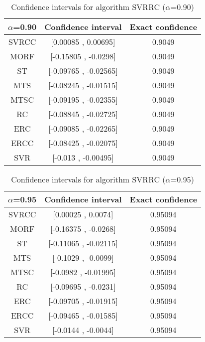 \documentclass[a4paper,10pt]{article}
\begin{document}
\begin{table}[!htp]
\centering\small
\begin{tabular}{
|c|c|c|}
\hline
 $\alpha$=0.90 & Confidence interval & Exact confidence \\ \hline 
SVRCC & [0.00085 , 0.00695] & 0.9049\\ \hline 
MORF & [-0.15805 , -0.0298] & 0.9049\\ \hline 
ST & [-0.09765 , -0.02565] & 0.9049\\ \hline 
MTS & [-0.08245 , -0.01515] & 0.9049\\ \hline 
MTSC & [-0.09195 , -0.02355] & 0.9049\\ \hline 
RC & [-0.08845 , -0.02725] & 0.9049\\ \hline 
ERC & [-0.09085 , -0.02265] & 0.9049\\ \hline 
ERCC & [-0.08425 , -0.02075] & 0.9049\\ \hline 
SVR & [-0.013 , -0.00495] & 0.9049\\ \hline 

\end{tabular}
\caption{Confidence intervals for algorithm SVRRC ($\alpha$=0.90)}
\end{table}
\begin{table}[!htp]
\centering\small
\begin{tabular}{
|c|c|c|}
\hline
 $\alpha$=0.95 & Confidence interval & Exact confidence \\ \hline 
SVRCC & [0.00025 , 0.0074] & 0.95094\\ \hline 
MORF & [-0.16375 , -0.0268] & 0.95094\\ \hline 
ST & [-0.11065 , -0.02115] & 0.95094\\ \hline 
MTS & [-0.1029 , -0.0099] & 0.95094\\ \hline 
MTSC & [-0.0982 , -0.01995] & 0.95094\\ \hline 
RC & [-0.09695 , -0.0231] & 0.95094\\ \hline 
ERC & [-0.09705 , -0.01915] & 0.95094\\ \hline 
ERCC & [-0.09465 , -0.01585] & 0.95094\\ \hline 
SVR & [-0.0144 , -0.0044] & 0.95094\\ \hline 

\end{tabular}
\caption{Confidence intervals for algorithm SVRRC ($\alpha$=0.95)}
\end{table}

 \clearpage 
\end{document}
